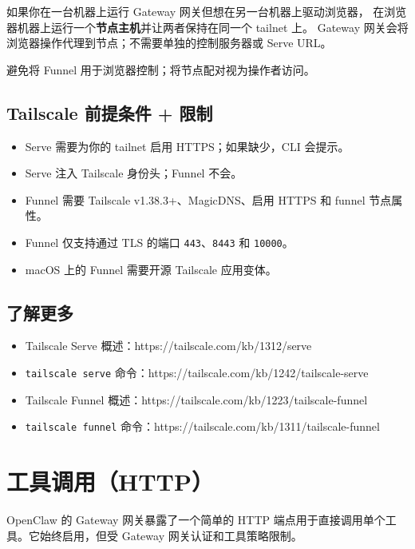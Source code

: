 如果你在一台机器上运行 Gateway 网关但想在另一台机器上驱动浏览器，
在浏览器机器上运行一个\textbf{节点主机}并让两者保持在同一个 tailnet 上。
Gateway 网关会将浏览器操作代理到节点；不需要单独的控制服务器或 Serve URL。

避免将 Funnel 用于浏览器控制；将节点配对视为操作者访问。

\subsection{Tailscale 前提条件 + 限制}


\begin{itemize}
  \item Serve 需要为你的 tailnet 启用 HTTPS；如果缺少，CLI 会提示。
  \item Serve 注入 Tailscale 身份头；Funnel 不会。
  \item Funnel 需要 Tailscale v1.38.3+、MagicDNS、启用 HTTPS 和 funnel 节点属性。
  \item Funnel 仅支持通过 TLS 的端口 \texttt{443}、\texttt{8443} 和 \texttt{10000}。
  \item macOS 上的 Funnel 需要开源 Tailscale 应用变体。
\end{itemize}


\subsection{了解更多}


\begin{itemize}
  \item Tailscale Serve 概述：https://tailscale.com/kb/1312/serve
  \item \texttt{tailscale serve} 命令：https://tailscale.com/kb/1242/tailscale-serve
  \item Tailscale Funnel 概述：https://tailscale.com/kb/1223/tailscale-funnel
  \item \texttt{tailscale funnel} 命令：https://tailscale.com/kb/1311/tailscale-funnel
\end{itemize}



\clearpage

\section{工具调用（HTTP）}


OpenClaw 的 Gateway 网关暴露了一个简单的 HTTP 端点用于直接调用单个工具。它始终启用，但受 Gateway 网关认证和工具策略限制。

